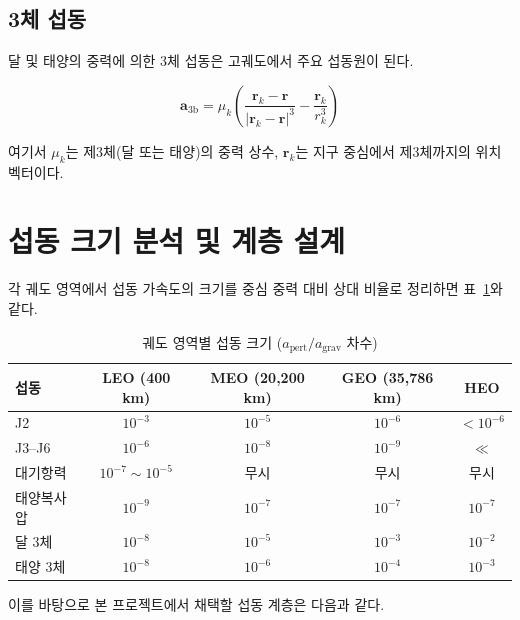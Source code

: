 \documentclass[11pt]{article}
\begin{document}
\subsection{3체 섭동}

달 및 태양의 중력에 의한 3체 섭동은 고궤도에서 주요 섭동원이 된다.

\begin{equation}
  \mathbf{a}_{3\mathrm{b}} = \mu_k \left(\frac{\mathbf{r}_k - \mathbf{r}}{|\mathbf{r}_k - \mathbf{r}|^3} - \frac{\mathbf{r}_k}{r_k^3}\right)
  \label{eq:thirdbody}
\end{equation}

여기서 $\mu_k$는 제3체(달 또는 태양)의 중력 상수,
$\mathbf{r}_k$는 지구 중심에서 제3체까지의 위치 벡터이다.

\section{섭동 크기 분석 및 계층 설계}

각 궤도 영역에서 섭동 가속도의 크기를 중심 중력 대비 상대 비율로 정리하면
표~\ref{tab:pert_magnitude}와 같다.

\begin{table}[h]
  \centering
  \caption{궤도 영역별 섭동 크기 ($a_\mathrm{pert}/a_\mathrm{grav}$ 차수)}
  \label{tab:pert_magnitude}
  \begin{tabular}{lcccc}
    \toprule
    섭동 & LEO (400 km) & MEO (20,200 km) & GEO (35,786 km) & HEO \\
    \midrule
    J2              & $10^{-3}$ & $10^{-5}$ & $10^{-6}$ & $<10^{-6}$ \\
    J3--J6          & $10^{-6}$ & $10^{-8}$ & $10^{-9}$ & $\ll$ \\
    대기항력        & $10^{-7}\sim10^{-5}$ & 무시 & 무시 & 무시 \\
    태양복사압      & $10^{-9}$ & $10^{-7}$ & $10^{-7}$ & $10^{-7}$ \\
    달 3체          & $10^{-8}$ & $10^{-5}$ & $10^{-3}$ & $10^{-2}$ \\
    태양 3체        & $10^{-8}$ & $10^{-6}$ & $10^{-4}$ & $10^{-3}$ \\
    \bottomrule
  \end{tabular}
\end{table}

이를 바탕으로 본 프로젝트에서 채택할 섭동 계층은 다음과 같다.
\end{document}
